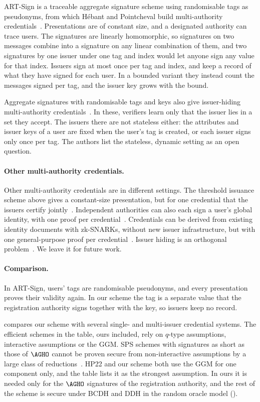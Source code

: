 ART-Sign is a traceable aggregate signature scheme using randomisable tags as
pseudonyms, from which H\'ebant and Pointcheval build multi-authority
credentials~\cite{SCN:HebPoi22}. Presentations are of constant size, and a
designated authority can trace users. The signatures are linearly homomorphic,
so signatures on two messages combine into a signature on any linear
combination of them, and two signatures by one issuer under one tag and index
would let anyone sign any value for that index. Issuers sign at most once per
tag and index, and keep a record of what they have signed for each user. In a
bounded variant they instead count the messages signed per tag, and the issuer
key grows with the bound.

Aggregate signatures with randomisable tags and keys also give issuer-hiding
multi-authority credentials~\cite{CCS:MBGLS23}. In these, verifiers learn only
that the issuer lies in a set they accept. The issuers there are not stateless
either: the attributes and issuer keys of a user are fixed when the user's tag
is created, or each issuer signs only once per tag. The authors list the
stateless, dynamic setting as an open question.

\paragraph{Other multi-authority credentials.} Other multi-authority
credentials are in different settings. The threshold issuance scheme above
gives a constant-size presentation, but for one credential that the issuers
certify jointly~\cite{EPRINT:GGPR25}. Independent authorities can also each sign a user's global
identity, with one proof per credential~\cite{anada2019decentralized}.
Credentials can be derived from existing identity documents with zk-SNARKs,
without new issuer infrastructure, but with one general-purpose proof per
credential~\cite{SP:RWGM23}. Issuer hiding is an orthogonal
problem~\cite{CANS:BEKRS21,PoPETS:SanTra24}. We leave it for future work.

\paragraph{Comparison.} In ART-Sign, users' tags are randomisable pseudonyms, and
every presentation proves their validity again. In our scheme the tag is a
separate value that the registration authority signs together with the key, so
issuers keep no record.

 compares our scheme with several single- and
multi-issuer credential systems. The efficient schemes in the table, ours
included, rely on $q$-type assumptions, interactive assumptions or the GGM. SPS
schemes with signatures as short as those of $\AGHO$ cannot be proven secure
from non-interactive assumptions by a large class of
reductions~\cite{AC:AbeGroOhk11}. HP22 and our scheme both use the GGM for one
component only, and the table lists it as the strongest assumption. In ours it
is needed only for the $\AGHO$ signatures of the registration authority, and the
rest of the scheme is secure under BCDH and DDH in the random oracle model
().

